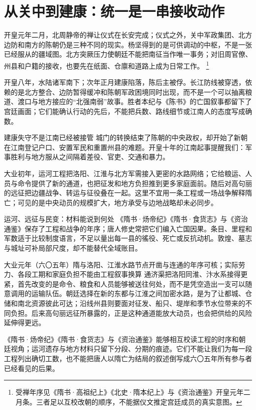 \section{从关中到建康：统一是一串接收动作}
\label{sec:sui-curated-chronicle}

开皇元年二月，北周静帝的禅让仪式在长安完成；仪式之外，关中军政集团、北方边防和南方的陈朝仍是三种不同的现实。杨坚得到的是可供调动的中枢，不是一张已经服从的疆域图。北方突厥压力使朝廷不能把南征当作唯一事务；对旧周官僚、州县和户籍的接收，也要先在纸面、仓廪和道路上成为日常工作。%
\footnote{受禅年序见《隋书·高祖纪上》《北史·隋本纪上》与《资治通鉴》开皇元年二月条。三者足以互校改朝的顺序，不能据仪文推定宫廷成员的真实意图。}

开皇八年，水陆诸军南下；次年正月建康陷落，陈后主被俘。长江防线被穿透，依赖的是北方整合、边防暂得缓冲和陈朝军政困境同时出现，而不是一个可以抽离粮道、渡口与地方接应的“北强南弱”故事。胜者本纪与《陈书》的亡国叙事都留下了宫廷画面；它们能确认行动的先后，不能把兵数、路线细节或江南人的态度写成确数。

\begin{turningpoint}{建康失守不是江南已经被接管}
城门的转换结束了陈朝的中央政权，却开始了新朝在江南登记户口、安置军民和重置州县的难题。开皇十年的江南起事提醒我们：军事胜利与地方服从之间隔着差役、官吏、交通和暴力。
\end{turningpoint}

大业初年，运河工程把洛阳、江淮与北方军需接入更密的水路网络；它给粮运、人员与命令提供了新的通道，也把征发和地方负担推到更多家庭面前。随后对高句丽的远征把边疆战争、转运与征役叠在一起。这里不宜用一条工程或一场战争解释隋亡；可见的是中央动员的规模扩大，地方承受与边地战略却未必同步。

\begin{sourcenote}{运河、远征与民变：材料能说到何处}
《隋书·炀帝纪》《隋书·食货志》与《资治通鉴》保存了工程和战争的年序；唐人修史常把它们编入亡国因果。条目、里程和军数适于比较制度语言，不足以量出每一县的徭役、死亡或反抗动机。敦煌、墓志与城址可补局部尺度，却不能替代全域账目。
\end{sourcenote}

\begin{event}{}{大业元年（六〇五年）}{隋与洛阳、江淮水路节点}{开凿与连通的年序可核；实际劳力、各段工期和家庭负担不能由工程叙事换算}
通济渠把洛阳同淮、汴水系接得更紧，首先改变的是命令、粮食和人员能够被送往何处，而不是凭空造出一支可以随意调用的运输队伍。朝廷选择在新的东都与江淮之间加密水路，是为了让都城、仓储和南北资源彼此可达；沿线州县则要面对征发、船只、堤岸和季节水位带来的不同负担。后来高句丽远征所暴露的，正是这种通道能放大动员，也会把供给的风险延伸得更远。

《隋书·炀帝纪》《隋书·食货志》与《资治通鉴》能够相互校读工程的时序和朝廷视角；运河遗存与地方材料只留下分段、分期的痕迹。它们不能让我们为每一段工程列出确切工数，也不能把唐人以隋亡为结局的叙述倒写成六〇五年所有参与者已经看见的后果。
\end{event}

